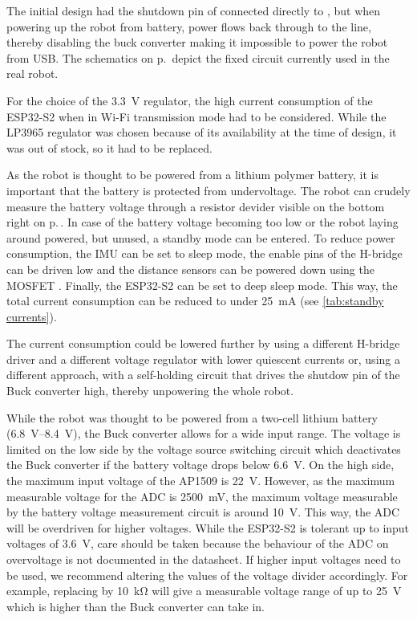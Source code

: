 The initial design had the shutdown pin of  connected directly to
, but when powering up the robot from battery, power flows
back through  to the  line, thereby disabling the
buck converter making it impossible to power the robot from USB.
The schematics on p.\,\pageref{schematic:power} depict the fixed circuit
currently used in the real robot.

For the choice of the \SI{3.3}{\volt} regulator, the high current consumption
of the ESP32-S2 when in Wi-Fi transmission mode had to be considered.
While the LP3965 regulator was chosen because of its
availability at the time of design, it was out of stock, so it had to be
replaced.

As the robot is thought to be powered from a lithium polymer battery, it is
important that the battery is protected from undervoltage.
The robot can crudely measure the battery voltage through a resistor devider
visible on the bottom right on p.\,\pageref{schematic:power}.
In case of the battery voltage becoming too low or the robot laying around
powered, but unused, a standby mode can be entered.
To reduce power consumption, the IMU can be set to sleep mode, the enable pins
of the H-bridge can be driven low and the distance sensors can be powered down
using the MOSFET .
Finally, the ESP32-S2 can be set to deep sleep mode.
This way, the total current consumption can be reduced to under
\SI{25}{\milli\ampere} (see \autoref{tab:standby currents}).

The current consumption could be lowered further by using a different H-bridge
driver and a different voltage regulator with lower quiescent currents or,
using a different approach, with a self-holding circuit that drives the
shutdow pin of the Buck converter high, thereby unpowering the whole robot.

While the robot was thought to be powered from a two-cell lithium battery
(\SIrange{6.8}{8.4}{\volt}), the Buck converter allows for a wide input range.
The voltage is limited on the low side by the voltage source switching circuit
which deactivates the Buck converter if the battery voltage drops below
\SI{6.6}{\volt}.
On the high side, the maximum input voltage of the AP1509 is \SI{22}{\volt}.
However, as the maximum measurable voltage for the ADC is
\SI{2500}{\milli\volt}, the maximum voltage measurable by the battery voltage
measurement circuit is around \SI{10}{\volt}.
This way, the ADC will be overdriven for higher voltages.
While the ESP32-S2 is tolerant up to input voltages of \SI{3.6}{\volt}, care
should be taken because the behaviour of the ADC on overvoltage is not
documented in the datasheet.
If higher input voltages need to be used, we recommend altering the values of
the voltage divider accordingly.
For example, replacing  by \SI{10}{\kilo\ohm} will give a
measurable voltage range of up to \SI{25}{\volt} which is higher than the Buck
converter can take in.
